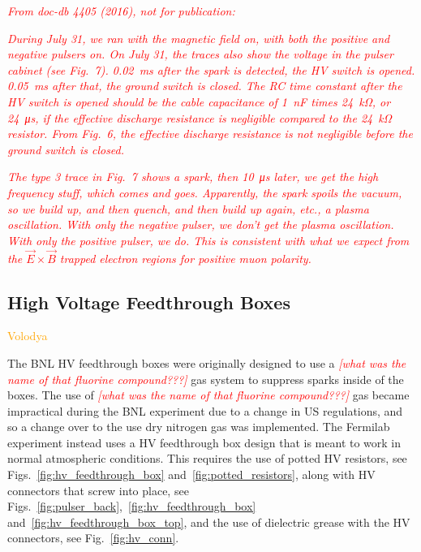 \textcolor{red}{\textit{From doc-db 4405 (2016), not for publication:}}

\textcolor{red}{\textit{During July 31, we ran with the magnetic field on, with both the positive and negative pulsers on. On July 31, the traces also show the voltage in the pulser cabinet (see Fig.~7). \SI{0.02}{\milli\second} after the spark is detected, the HV switch is opened. \SI{0.05}{\milli\second} after that, the ground switch is closed. The RC time constant after the HV switch is opened should be the cable capacitance of \SI{1}{\nano\farad} times \SI{24}{\kilo\ohm}, or \SI{24}{\micro\second}, if the effective discharge resistance is negligible compared to the \SI{24}{\kilo\ohm} resistor. From Fig.~6, the effective discharge resistance is not negligible before the ground switch is closed.}}

\textcolor{red}{\textit{The type 3 trace in Fig.~7 shows a spark, then \SI{10}{\micro\second} later, we get the high frequency stuff, which comes and goes. Apparently, the spark spoils the vacuum, so we build up, and then quench, and then build up again, etc., a plasma oscillation. With only the negative pulser, we don't get the plasma oscillation. With only the positive pulser, we do. This is consistent with what we expect from the $\vec{E}\times\vec{B}$ trapped electron regions for positive muon polarity.}}

\subsection{\label{sec:boxes} High Voltage Feedthrough Boxes}
\textcolor{orange}{Volodya}
\medskip

The BNL HV feedthrough boxes were originally designed to use a \textcolor{red}{\textit{[what was the name of that fluorine compound???]}} gas system to suppress sparks inside of the boxes. The use of \textcolor{red}{\textit{[what was the name of that fluorine compound???]}} gas became impractical during the BNL experiment due to a change in US regulations, and so a change over to the use dry nitrogen gas was implemented. The Fermilab experiment instead uses a HV feedthrough box design that is meant to work in normal atmospheric conditions. This requires the use of potted HV resistors, see Figs.~\ref{fig:hv_feedthrough_box} and~\ref{fig:potted_resistors}, along with HV connectors that screw into place, see Figs.~\ref{fig:pulser_back},~\ref{fig:hv_feedthrough_box} and~\ref{fig:hv_feedthrough_box_top}, and the use of dielectric grease with the HV connectors, see Fig.~\ref{fig:hv_conn}.

